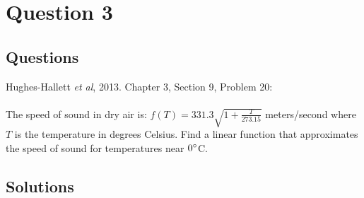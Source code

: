 \chapter{Question 3}
\section{Questions}
Hughes-Hallett \emph{et al}, 2013. Chapter 3, Section 9, Problem 20: \\
\\
\noindent The speed of sound in dry air is:
$f(T) = 331.3\sqrt{1+\frac{T}{273.15}}$ meters/second where $T$ is the
temperature in degrees Celsius. Find a linear function that approximates the
speed of sound for temperatures near $0\degree$C.

\section{Solutions}

